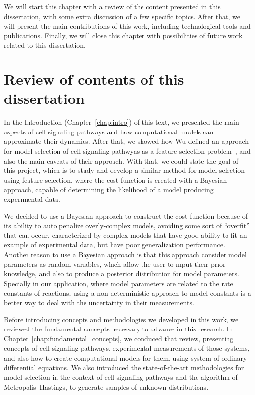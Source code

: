 We will start this chapter with a review of the content presented in 
this dissertation, with some extra discussion of a few specific topics.
After that, we will present the main contributions of this work,
including technological tools and publications. Finally, we will close
this chapter with possibilities of future work related to this
dissertation.


\section{Review of contents of this dissertation}
In the Introduction (Chapter~\ref{chap:intro}) of this text, we presented the main aspects of cell
signaling pathways and how computational models can approximate their
dynamics. After that, we showed how Wu defined an approach
for model selection of cell signaling pathwyas as a feature selection
problem~\cite{Wu15}, and also the main caveats of their approach. With that, we
could state the goal of this project, which is to study and develop a
similar method for model selection using feature selection, where the 
cost function is created with a Bayesian approach, capable of
determining the likelihood of a model producing experimental data.


We decided to use a Bayesian approach to construct the cost function
because of its ability to auto penalize overly-complex models, avoiding
some sort of ``overfit'' that can occur, characterized by complex models
that have good ability to fit an example of experimental data, but have 
poor generalization performance. Another reason to use a Bayesian
approach is that this approach consider model parameters as random 
variables, which allow the user to input their prior knowledge, and also
to produce a posterior distribution for model parameters. Specially in 
our application, where model parameters are related to the rate 
constants of reactions, using a non deterministic approach to model 
constants is a better way to deal with the uncertainty in their measurements.

%

Before introducing concepts and methodologies we developed in this work,
we reviewed the fundamental concepts necessary to advance in this 
research. In Chapter~\ref{chap:fundamental_concepts}, we conduced that review, presenting concepts
of cell signaling pathways, experimental measurements of those systems, 
and also how to create computational models for them, using system of 
ordinary differential equations. We also introduced the state-of-the-art
methodologies for model selection in the context of cell signaling
pathways and the algorithm of Metropolis--Hastings, to generate samples
of unknown distributions.

